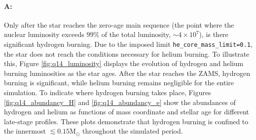 \documentclass[twocolumn,fontsize=11pt]{scrartcl}
\begin{document}
\paragraph{A:} Only after the star reaches the zero-age main sequence (the point where the nuclear luminosity exceeds \(99\%\) of the total luminosity, \(\sim 4 \times 10^7\)), is there significant hydrogen burning. Due to the imposed limit \texttt{he\_core\_mass\_limit=0.1}, the star does not reach the conditions necessary for helium burning. To illustrate this,
Figure \ref{fig:q14_luminosity} displays the evolution of hydrogen and helium burning luminosities as the star ages. After the star reaches the ZAMS, hydrogen burning is significant, while helium burning remains negligible for the entire simulation. To indicate where hydrogen burning takes place, Figures \ref{fig:q14_abundancy_H} and \ref{fig:q14_abundancy_e} show the abundances of hydrogen and helium as functions of mass coordinate and stellar age for different late-stage profiles. These plots demonstrate that hydrogen burning is confined to the innermost \(\lesssim 0.15 \text{M}_\odot\) throughout the simulated period.
\end{document}
